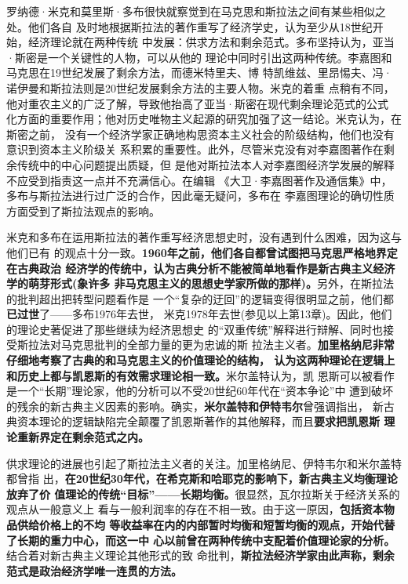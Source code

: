 罗纳德·米克和莫里斯·多布很快就察觉到在马克思和斯拉法之间有某些相似之处。他们各自
及时地根据斯拉法的著作重写了经济学史，认为至少从18世纪开始，经济理论就在两种传统
中发展：供求方法和剩余范式。多布坚持认为，亚当·斯密是一个关键性的人物，可以从他的
理论中同时引出这两种传统。李嘉图和马克思在19世纪发展了剩余方法，而德米特里夫、博
特凯维兹、里昂惕夫、冯·诺伊曼和斯拉法则是20世纪发展剩余方法的主要人物。米克的着重
点稍有不同，他对重农主义的广泛了解，导致他抬高了亚当·斯密在现代剩余理论范式的公式
化方面的重要作用；他对历史唯物主义起源的研究加强了这一结论。米克认为，在斯密之前，
没有一个经济学家正确地构思资本主义社会的阶级结构，他们也没有意识到资本主义阶级关
系积累的重要性。此外，尽管米克没有对李嘉图著作在剩余传统中的中心问题提出质疑，但
是他对斯拉法本人对李嘉图经济学发展的解释不应受到指责这一点并不充满信心。在编辑
《大卫·李嘉图著作及通信集》中，多布与斯拉法进行过广泛的合作，因此毫无疑问，多布在
李嘉图理论的确切性质方面受到了斯拉法观点的影响。

米克和多布在运用斯拉法的著作重写经济思想史时，没有遇到什么困难，因为这与他们已有
的观点十分一致。\textbf{1960年之前，他们各自都曾试图把马克思严格地界定在古典政治
  经济学的传统中，认为古典分析不能被简单地看作是新古典主义经济学的萌芽形式(象许多
  非马克思主义的思想史学家所做的那样)。}另外，在斯拉法的批判超出把转型问题看作是
一个“复杂的迂回”的逻辑变得很明显之前，他们都\textbf{已过世}了——多布1976年去世，
米克1978年去世(参见以上第13章)。因此，他们的理论史著促进了那些继续为经济思想史
的“双重传统”解释进行辩解、同时也接受斯拉法对马克思批判的全部力量的更为忠诚的斯
拉法主义者。\textbf{加里格纳尼非常仔细地考察了古典的和马克思主义的价值理论的结构，
  认为这两种理论在逻辑上和历史上都与凯恩斯的有效需求理论相一致。}米尔盖特认为，凯
恩斯可以被看作是一个“长期”理论家，他的分析可以不受20世纪60年代在“资本争论”中
遭到破坏的残余的新古典主义因素的影响。确实，\textbf{米尔盖特和伊特韦尔}曾强调指出，
新古典资本理论的逻辑缺陷完全颠覆了凯恩斯著作的其他解释，而且\textbf{要求把凯恩斯
  理论重新界定在剩余范式之内。}

供求理论的进展也引起了斯拉法主义者的关注。加里格纳尼、伊特韦尔和米尔盖特都曾指
出，\textbf{在20世纪30年代，在希克斯和哈耶克的影响下，新古典主义均衡理论放弃了价
  值理论的传统“目标”——长期均衡。}很显然，瓦尔拉斯关于经济关系的观点从一般意义上
看与一般利润率的存在不相一致。由于这一原因，\textbf{包括资本物品供给价格上的不均
  等收益率在内的内部暂时均衡和短暂均衡的观点，开始代替了长期的重力中心，而这一中
  心以前曾在两种传统中支配着价值理论家的分析。}结合着对新古典主义理论其他形式的致
命批判，\textbf{斯拉法经济学家由此声称，剩余范式是政治经济学唯一连贯的方法。}

